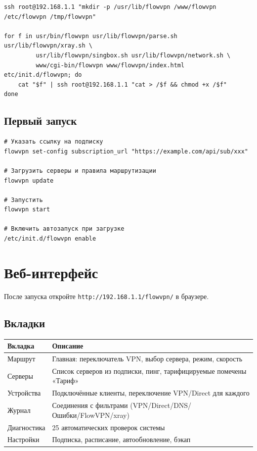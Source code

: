 \documentclass[11pt,a4paper]{article}
\begin{document}
\begin{lstlisting}
ssh root@192.168.1.1 "mkdir -p /usr/lib/flowvpn /www/flowvpn /etc/flowvpn /tmp/flowvpn"

for f in usr/bin/flowvpn usr/lib/flowvpn/parse.sh usr/lib/flowvpn/xray.sh \
         usr/lib/flowvpn/singbox.sh usr/lib/flowvpn/network.sh \
         www/cgi-bin/flowvpn www/flowvpn/index.html etc/init.d/flowvpn; do
    cat "$f" | ssh root@192.168.1.1 "cat > /$f && chmod +x /$f"
done
\end{lstlisting}

\subsection{Первый запуск}

\begin{lstlisting}
# Указать ссылку на подписку
flowvpn set-config subscription_url "https://example.com/api/sub/xxx"

# Загрузить серверы и правила маршрутизации
flowvpn update

# Запустить
flowvpn start

# Включить автозапуск при загрузке
/etc/init.d/flowvpn enable
\end{lstlisting}

\section{Веб-интерфейс}

После запуска откройте \texttt{http://192.168.1.1/flowvpn/} в браузере.

\subsection{Вкладки}

\begin{tabularx}{\textwidth}{l X}
\toprule
\textbf{Вкладка} & \textbf{Описание} \\
\midrule
Маршрут & Главная: переключатель VPN, выбор сервера, режим, скорость \\
Серверы & Список серверов из подписки, пинг, тарифицируемые помечены «Тариф» \\
Устройства & Подключённые клиенты, переключение VPN/Direct для каждого \\
Журнал & Соединения с фильтрами (VPN/Direct/DNS/Ошибки/FlowVPN/xray) \\
Диагностика & 25 автоматических проверок системы \\
Настройки & Подписка, расписание, автообновление, бэкап \\
\bottomrule
\end{tabularx}
\end{document}
